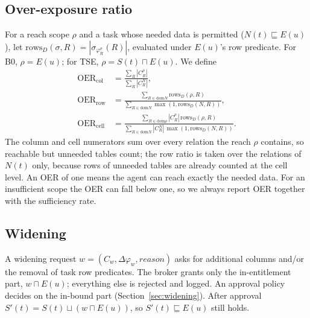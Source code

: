 \subsection{Over-exposure ratio}
For a reach scope $\rho$ and a task whose needed data is permitted ($N(t)\sqsubseteq E(u)$), let
$\mathrm{rows}_D(\sigma,R)=|\sigma_{\varphi^\sigma_R}(R)|$, evaluated under $E(u)$'s row predicate. For B0,
$\rho=E(u)$; for TSE, $\rho=S(t)\sqcap E(u)$. We define
\begin{align}
\mathrm{OER}_{\mathrm{col}} &= \frac{\sum_{R}|C^\rho_R|}{\sum_{R}|C^{N}_R|},\\
\mathrm{OER}_{\mathrm{row}} &= \frac{\sum_{R\in\mathrm{dom}N}\mathrm{rows}_D(\rho,R)}{\sum_{R\in\mathrm{dom}N}\max(1,\mathrm{rows}_D(N,R))},\\
\mathrm{OER}_{\mathrm{cell}} &= \frac{\sum_{R\in\mathrm{dom}\rho}|C^\rho_R|\,\mathrm{rows}_D(\rho,R)}{\sum_{R\in\mathrm{dom}N}|C^N_R|\,\max(1,\mathrm{rows}_D(N,R))}.
\end{align}
The column and cell numerators sum over every relation the reach $\rho$ contains, so reachable but unneeded tables count; the row ratio is taken over the relations of $N(t)$ only, because rows of unneeded tables are already counted at the cell level. An OER of one means the agent can reach exactly the needed data. For an insufficient scope the OER can fall
below one, so we always report OER together with the sufficiency rate.

\subsection{Widening}
A widening request $w=(C_w,\Delta\varphi_w,\textit{reason})$ asks for additional columns and/or the removal
of task row predicates. The broker grants only the in-entitlement part, $w\sqcap E(u)$; everything else is
rejected and logged. An approval policy decides on the in-bound part (Section~\ref{sec:widening}). After
approval $S'(t)=S(t)\sqcup(w\sqcap E(u))$, so $S'(t)\sqsubseteq E(u)$ still holds.

